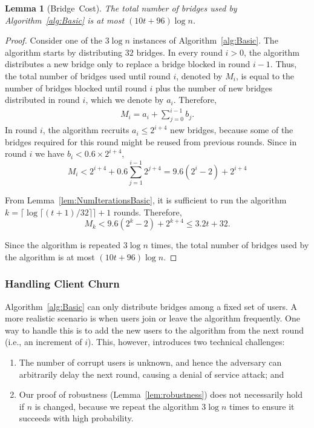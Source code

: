 \documentclass{sig-alternate-05-2015}
\newcommand{\ie}{i.e.}
\newtheorem{lemma}{Lemma}
\newcommand{\sfsize}{\fontsize{0.8\baselineskip}{0.68\baselineskip}\selectfont}
\newcommand{\sans}[1]{\textsf{\sfsize \mbox{#1}}}
\begin{document}
\begin{lemma}[\sans{Bridge Cost}] \label{lem:NumBridgesBasic}
	The total number of bridges used by Algorithm~\ref{alg:Basic} is at most ${(10t + 96)\log{n}}$. %
\end{lemma}
\begin{proof}
	Consider one of the $3\log{n}$ instances of Algorithm~\ref{alg:Basic}. The algorithm starts by distributing  $32$ bridges. In every round ${i > 0}$, the algorithm distributes a new bridge only to replace a bridge blocked in round ${i-1}$. Thus, the total number of bridges used until round $i$, denoted by $M_i$, is equal to the number of bridges blocked until round $i$ plus the number of new bridges distributed in round $i$, which we denote by $a_i$. Therefore,
	\begin{align}
		M_i = a_i + \sum_{j=0}^{i-1} b_j. \label{eq:NumBridges}
	\end{align}
	In round $i$, the algorithm recruits ${a_i \leq 2^{i+4}}$ new bridges, because some of the bridges required for this round might be reused from previous rounds. Since in round $i$ we have ${b_i < 0.6 \times 2^{i+4}}$,
	\[M_i < 2^{i+4} + 0.6\sum_{j=1}^{i-1} 2^{j+4} = 9.6(2^i - 2) + 2^{i+4}\]
	
	From Lemma~\ref{lem:NumIterationsBasic}, it is sufficient to run the algorithm ${k = \lceil \log{\lceil (t+1)/32 \rceil} \rceil + 1}$ rounds. Therefore,	
	\[M_k < 9.6(2^k - 2) + 2^{k+4} \leq 3.2t + 32.\]
	
	Since the algorithm is repeated $3\log{n}$ times, the total number of bridges used by the algorithm is at most ${(10t + 96)\log{n}}$. %
\end{proof}

\subsubsection{Handling Client Churn} \label{sec:churn}
Algorithm~\ref{alg:Basic} can only distribute bridges among a fixed set of users. A more realistic scenario is when users join or leave the algorithm frequently. One way to handle this is to add the new users to the algorithm from the next round (\ie, an increment of $i$). This, however, introduces two technical challenges: 
\begin{enumerate}[itemsep=0.5em, topsep=0.6em]
	\item The number of corrupt users is unknown, and hence the adversary can arbitrarily delay the next round, causing a denial of service attack; and
	
	\item Our proof of robustness (Lemma~\ref{lem:robustness}) does not necessarily hold if $n$ is changed, because we repeat the algorithm $3\log{n}$ times to ensure it succeeds with high probability. 
\end{enumerate}
\end{document}
